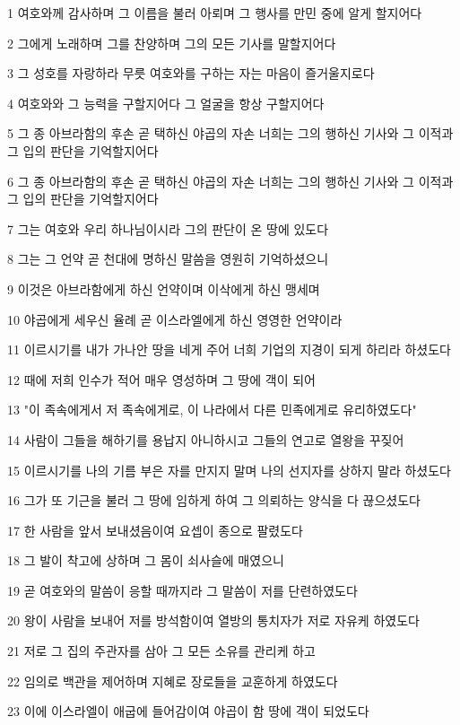 \par 1 여호와께 감사하며 그 이름을 불러 아뢰며 그 행사를 만민 중에 알게 할지어다
\par 2 그에게 노래하며 그를 찬양하며 그의 모든 기사를 말할지어다
\par 3 그 성호를 자랑하라 무릇 여호와를 구하는 자는 마음이 즐거울지로다
\par 4 여호와와 그 능력을 구할지어다 그 얼굴을 항상 구할지어다
\par 5 그 종 아브라함의 후손 곧 택하신 야곱의 자손 너희는 그의 행하신 기사와 그 이적과 그 입의 판단을 기억할지어다
\par 6 그 종 아브라함의 후손 곧 택하신 야곱의 자손 너희는 그의 행하신 기사와 그 이적과 그 입의 판단을 기억할지어다
\par 7 그는 여호와 우리 하나님이시라 그의 판단이 온 땅에 있도다
\par 8 그는 그 언약 곧 천대에 명하신 말씀을 영원히 기억하셨으니
\par 9 이것은 아브라함에게 하신 언약이며 이삭에게 하신 맹세며
\par 10 야곱에게 세우신 율례 곧 이스라엘에게 하신 영영한 언약이라
\par 11 이르시기를 내가 가나안 땅을 네게 주어 너희 기업의 지경이 되게 하리라 하셨도다
\par 12 때에 저희 인수가 적어 매우 영성하며 그 땅에 객이 되어
\par 13 "이 족속에게서 저 족속에게로, 이 나라에서 다른 민족에게로 유리하였도다"
\par 14 사람이 그들을 해하기를 용납지 아니하시고 그들의 연고로 열왕을 꾸짖어
\par 15 이르시기를 나의 기름 부은 자를 만지지 말며 나의 선지자를 상하지 말라 하셨도다
\par 16 그가 또 기근을 불러 그 땅에 임하게 하여 그 의뢰하는 양식을 다 끊으셨도다
\par 17 한 사람을 앞서 보내셨음이여 요셉이 종으로 팔렸도다
\par 18 그 발이 착고에 상하며 그 몸이 쇠사슬에 매였으니
\par 19 곧 여호와의 말씀이 응할 때까지라 그 말씀이 저를 단련하였도다
\par 20 왕이 사람을 보내어 저를 방석함이여 열방의 통치자가 저로 자유케 하였도다
\par 21 저로 그 집의 주관자를 삼아 그 모든 소유를 관리케 하고
\par 22 임의로 백관을 제어하며 지혜로 장로들을 교훈하게 하였도다
\par 23 이에 이스라엘이 애굽에 들어감이여 야곱이 함 땅에 객이 되었도다
